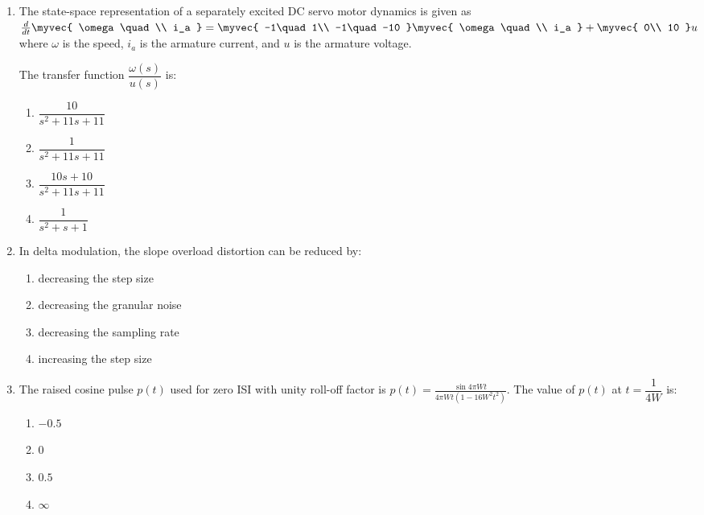 \documentclass[journal,12pt,onecolumn]{IEEEtran}
\theoremstyle{remark}
\begin{document}
\begin{enumerate}
 \item
    The state-space representation of a separately excited DC servo motor dynamics is given as
    $
    \frac{d}{dt}
    \myvec{
        \omega\quad\\
        i_a
    }
    =
    \myvec{
        -1\quad 1\\
        -1\quad -10
    }
    \myvec{
        \omega\quad\\
        i_a
    }
    +
    \myvec{
        0\\
        10
    }
    u
    $
    \quad where $\omega$ is the speed, $i_a$ is the armature current, and $u$ is the armature voltage. \quad

    The transfer function $\dfrac{\omega(s)}{u(s)}$ is: 
\hfill{}
\begin{multicols}{4}
\begin{enumerate}
    \item $\dfrac{10}{s^2+11s+11}$
    \item $\dfrac{1}{s^2+11s+11}$
    \item $\dfrac{10s+10}{s^2+11s+11}$
    \item $\dfrac{1}{s^2+s+1}$
\end{enumerate}
\end{multicols}

\item In delta modulation, the slope overload distortion can be reduced by: 
\hfill{}
\begin{enumerate}
    \item decreasing the step size
    \item decreasing the granular noise
    \item decreasing the sampling rate
    \item increasing the step size
\end{enumerate}

\item The raised cosine pulse $p(t)$ used for zero ISI with unity roll-off factor is
$
p(t)=\frac{\sin 4\pi W t}{4\pi W t(1-16W^2 t^2)}.
$
The value of $p(t)$ at $t=\dfrac{1}{4W}$ is:
\hfill{}
\begin{multicols}{4}
\begin{enumerate}
    \item $-0.5$
    \item $0$
    \item $0.5$
    \item $\infty$
\end{enumerate}
\end{multicols}


\end{enumerate}
\end{document}
